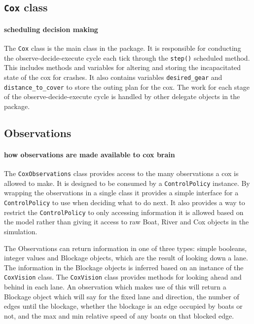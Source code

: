 \subsection{\texttt{Cox} class}
\paragraph{scheduling decision making}
The \texttt{Cox} class is the main class in the package. It is responsible for conducting the observe-decide-execute cycle each tick through the \texttt{step()} scheduled method. This includes methods and variables for altering and storing the incapacitated state of the cox for crashes. It also contains variables \texttt{desired\_gear} and \texttt{distance\_to\_cover} to store the outing plan for the cox. The work for each stage of the observe-decide-execute cycle is handled by other delegate objects in the package.

\subsection{Observations}
\paragraph{how observations are made available to cox brain}
The \texttt{CoxObservations} class provides access to the many observations a cox is allowed to make. It is designed to be consumed by a \texttt{ControlPolicy} instance. By wrapping the observations in a single class it provides a simple interface for a \texttt{ControlPolicy} to use when deciding what to do next. It also provides a way to restrict the \texttt{ControlPolicy} to only accessing information it is allowed based on the model rather than giving it access to raw Boat, River and Cox objects in the simulation.

The Observations can return information in one of three types: simple booleans, integer values and Blockage objects, which are the result of looking down a lane. The information in the Blockage objects is inferred based on an instance of the \texttt{CoxVision} class. The \texttt{CoxVision} class provides methods for looking ahead and behind in each lane. An observation which makes use of this will return a Blockage object which will say for the fixed lane and direction, the number of edges until the blockage, whether the blockage is an edge occupied by boats or not, and the max and min relative speed of any boats on that blocked edge.

